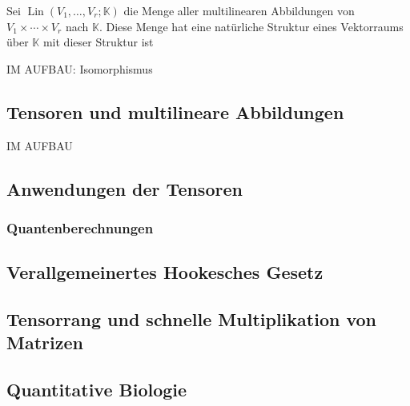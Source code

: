 \documentclass[
a4paper,12pt,
bibliography=totocnumbered,
numbers=noenddot,
]{scrartcl}
\numberwithin{equation}{subsection}
\newcommand{\N}{\mathbb N}
\newcommand{\R}{\mathbb R}
\newcommand{\K}{\mathbb K}
\newcommand{\lin}{\operatorname{lin}} %
\newcommand{\Lin}{\operatorname{Lin}} %
\theoremstyle{plain}
\theoremstyle{definition}
\begin{document}
Sei $\Lin(V_1,\ldots,V_r ; \K)$ die Menge aller multilinearen Abbildungen von $V_1 \times \cdots \times V_r$ nach $\K$.
Diese Menge hat eine natürliche Struktur eines Vektorraums über $\K$ mit dieser Struktur ist 

IM AUFBAU: Isomorphismus 

\subsection{Tensoren und multilineare Abbildungen} 

IM AUFBAU 


\subsection{Anwendungen der Tensoren} 

\subsubsection{Quantenberechnungen} 


\subsection{Verallgemeinertes Hookesches Gesetz} 

\subsection{ Tensorrang und schnelle Multiplikation von Matrizen} 

\subsection{Quantitative Biologie}


\end{document}
